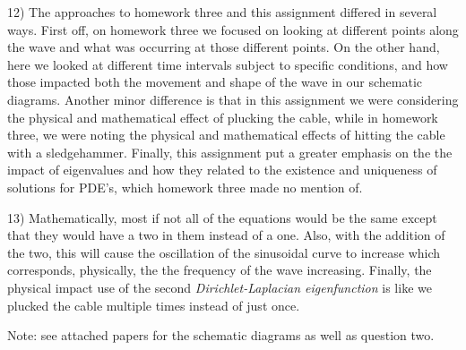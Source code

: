 \documentclass[executivepaper]{article}
\begin{document}
\begin{flushleft}

12) The approaches to homework three and this assignment differed in several ways. First off, on homework three we focused on looking at different points along the wave and what was occurring at those different points. On the other hand, here we looked at different time intervals subject to specific conditions, and how those impacted both the movement and shape of the wave in our schematic diagrams. Another minor difference is that in this assignment we were considering the physical and mathematical effect of plucking the cable, while in homework three, we were noting the physical and mathematical effects of hitting the cable with a sledgehammer. Finally, this assignment put a greater emphasis on the the impact of eigenvalues and how they related to the existence and uniqueness of solutions for PDE's, which homework three made no mention of.

\end{flushleft}

\begin{flushleft}

13) Mathematically, most if not all of the equations would be the same except that they would have a two in them instead of a one. Also, with the addition of the two, this will cause the oscillation of the sinusoidal curve to increase which corresponds, physically, the the frequency of the wave increasing. Finally, the physical impact use of the second \textit{Dirichlet-Laplacian eigenfunction} is like we plucked the cable multiple times instead of just once.

\end{flushleft}

Note: see attached papers for the schematic diagrams as well as question two.
\end{document}
